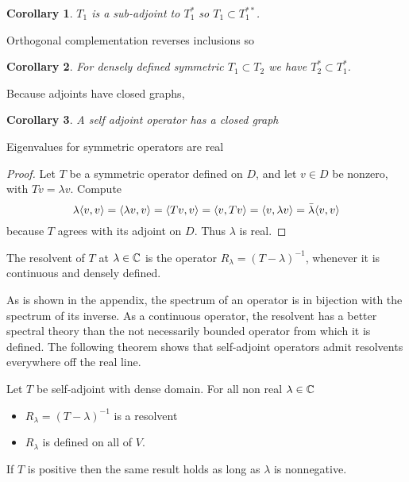 \documentclass[11pt]{amsart}
\newtheorem{cor}{Corollary}
\begin{document}
	\begin{cor}
	$T_1$ is a sub-adjoint to $T_{1}^{*}$ so $T_{1}\subset T^{**}_{1}$.
	\end{cor}
Orthogonal complementation reverses inclusions so
	\begin{cor} For densely defined symmetric $T_1 \subset T_{2}$ we have $T^{*}_{2}\subset T^{*}_{1}$.  \end{cor}
Because adjoints have closed graphs,
	\begin{cor} A self adjoint operator has a closed graph \end{cor}
	\medskip
	\begin{claim} Eigenvalues for symmetric operators are real \end{claim}
		\begin{proof}
			Let $T$ be a symmetric operator defined on $D$, and let $v \in D$ be nonzero, with $Tv=\lambda v$. Compute
				\begin{equation*}
					\lambda \langle v, v \rangle = \langle \lambda v, v \rangle = \langle Tv, v \rangle = \langle v, Tv \rangle = \langle v, \lambda v \rangle=\bar{\lambda}\langle v, v \rangle
				\end{equation*}
			because $T$ agrees with its adjoint on $D$. Thus $\lambda$ is real.
		\end{proof}
	\begin{mydef} The resolvent of $T$ at $\lambda \in \mathbb{C}$ is the operator $R_\lambda=(T-\lambda)^{-1}$, whenever it is continuous and densely defined. \end{mydef}
	As is shown in the appendix, the spectrum of an operator is in bijection with the spectrum of its inverse. As a continuous operator, the resolvent has a better spectral theory than the not necessarily bounded operator from which it is defined. The following theorem shows that self-adjoint operators admit resolvents everywhere off the real line.
		\begin{thm} Let $T$ be self-adjoint with dense domain. For all non real $\lambda \in \mathbb{C}$ 
			\begin{itemize}
				\item $R_\lambda=(T-\lambda)^{-1}$ is a resolvent
				\item $R_\lambda$ is defined on all of $V$.
			\end{itemize}
 If $T$ is positive then the same result holds as long as $\lambda$ is nonnegative.
 		\end{thm}
\end{document}
